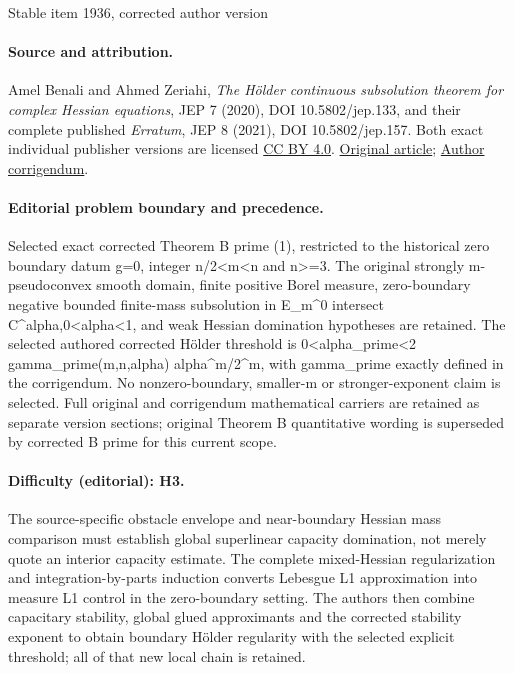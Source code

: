 \documentclass[11pt]{article}
\numberwithin{equation}{section}
\theoremstyle{definition}
\theoremstyle{plain}
\theoremstyle{definition}
\def\jepversionprefix{original}
\begin{document}
\makeatletter
\let\jeprawlabel\label
\let\jeprawref\ref
\let\jeprawltxlabel\ltx@label
\renewcommand{\label}[1]{\jeprawlabel{\jepversionprefix:#1}}
\renewcommand{\ref}[1]{\jeprawref{\jepversionprefix:#1}}
\def\ltx@label#1{\jeprawltxlabel{\jepversionprefix:#1}}
\makeatother
\begin{center}{\Large Stable item 1936, corrected author version}\end{center}
\paragraph{Source and attribution.}
Amel Benali and Ahmed Zeriahi, \emph{The Hölder continuous subsolution theorem for complex Hessian equations}, JEP 7 (2020), DOI 10.5802/jep.133, and their complete published \emph{Erratum}, JEP 8 (2021), DOI 10.5802/jep.157. Both exact individual publisher versions are licensed \href{https://creativecommons.org/licenses/by/4.0/}{CC BY 4.0}. \href{https://jep.centre-mersenne.org/articles/10.5802/jep.133/}{Original article}; \href{https://jep.centre-mersenne.org/articles/10.5802/jep.157/}{Author corrigendum}.
\paragraph{Editorial problem boundary and precedence.}
Selected exact corrected Theorem B prime (1), restricted to the historical zero boundary datum g=0, integer n/2<m<n and n>=3. The original strongly m-pseudoconvex smooth domain, finite positive Borel measure, zero-boundary negative bounded finite-mass subsolution in E\_m\textasciicircum{}0 intersect C\textasciicircum{}alpha,0<alpha<1, and weak Hessian domination hypotheses are retained. The selected authored corrected Hölder threshold is 0<alpha\_prime<2 gamma\_prime(m,n,alpha) alpha\textasciicircum{}m/2\textasciicircum{}m, with gamma\_prime exactly defined in the corrigendum. No nonzero-boundary, smaller-m or stronger-exponent claim is selected. Full original and corrigendum mathematical carriers are retained as separate version sections; original Theorem B quantitative wording is superseded by corrected B prime for this current scope.
\paragraph{Difficulty (editorial): H3.}
The source-specific obstacle envelope and near-boundary Hessian mass comparison must establish global superlinear capacity domination, not merely quote an interior capacity estimate. The complete mixed-Hessian regularization and integration-by-parts induction converts Lebesgue L1 approximation into measure L1 control in the zero-boundary setting. The authors then combine capacitary stability, global glued approximants and the corrected stability exponent to obtain boundary Hölder regularity with the selected explicit threshold; all of that new local chain is retained.
\end{document}
